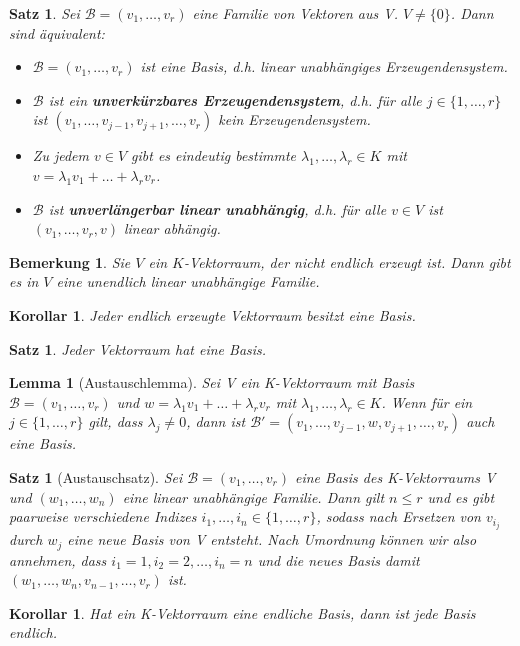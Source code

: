 \documentclass[12pt,a4paper]{article}
\theoremstyle{plain}
\newtheorem{Satz}[Theorem]{Satz}
\newtheorem{Lemma}[Theorem]{Lemma}
\newtheorem{Korollar}[Theorem]{Korollar}
\newtheorem{Bemerkung}[Theorem]{Bemerkung}
\newcommand{\herv}[1]{{\emph{\textbf{#1}}}}
\numberwithin{equation}{section}
\begin{document}
\begin{Satz}
Sei $\mathcal{B}=(v_1,\ldots,v_r)$ eine Familie von Vektoren aus V. $V\neq \{0\}$. Dann sind äquivalent:
\begin{itemize}
\renewcommand{\labelenumi}{\emph{(\roman{enumi})}}
\item $\mathcal{B}=(v_1,\ldots,v_r)$ ist eine Basis, d.h. linear unabhängiges Erzeugendensystem.
\item $\mathcal{B}$ ist ein \herv{unverkürzbares Erzeugendensystem}, d.h. für alle $j\in \{1,\ldots,r\}$ ist $(v_1,\ldots,v_{j-1},v_{j+1},\ldots,v_r)$ kein Erzeugendensystem.
\item Zu jedem $v\in V$ gibt es eindeutig bestimmte $\lambda_1,\ldots,\lambda_r\in K$ mit $v=\lambda_1 v_1+\ldots+\lambda_r v_r$.
\item $\mathcal{B}$ ist \herv{unverlängerbar linear unabhängig}, d.h. für alle $v\in V$ ist $(v_1,\ldots,v_r,v)$ linear abhängig. 
\end{itemize}
\end{Satz}
\begin{Bemerkung}
Sie $V$ ein $K$-Vektorraum, der nicht endlich erzeugt ist. Dann gibt es in $V$ eine unendlich linear unabhängige Familie.
\end{Bemerkung}
\begin{Korollar}
Jeder endlich erzeugte Vektorraum besitzt eine Basis.
\end{Korollar}
\begin{Satz}
Jeder Vektorraum hat eine Basis.
\end{Satz}
\begin{Lemma}[Austauschlemma]
Sei V ein K-Vektorraum mit Basis $\mathcal{B}=(v_1,\ldots,v_r)$ und $w=\lambda_1 v_1+\ldots+\lambda_r v_r$ mit $\lambda_1,\ldots,\lambda_r\in K$. Wenn für ein $j\in\{1,\ldots,r\}$ gilt, dass $\lambda_j\neq 0$, dann ist $\mathcal{B}'=(v_1,\ldots,v_{j-1},w,v_{j+1},\ldots,v_r)$ auch eine Basis.
\end{Lemma}
\begin{Satz}[Austauschsatz]
Sei $\mathcal{B}=(v_1,\ldots,v_r)$ eine Basis des K-Vektorraums V und $(w_1,\ldots,w_n)$ eine linear unabhängige Familie. Dann gilt $n\leq r$ und es gibt paarweise verschiedene Indizes $i_1,\ldots,i_n\in \{1,\ldots,r\}$, sodass nach Ersetzen von $v_{i_j}$ durch $w_j$ eine neue Basis von V entsteht. Nach Umordnung können wir also annehmen, dass $i_1=1,i_2=2,\ldots,i_n=n$ und die neues Basis damit $(w_1,\ldots,w_n,v_{n-1},\ldots,v_r)$ ist.
\end{Satz}
\begin{Korollar}
Hat ein K-Vektorraum eine endliche Basis, dann ist jede Basis endlich.
\end{Korollar}
\end{document}
